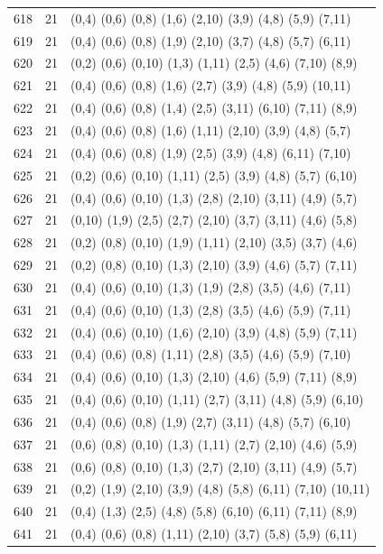 {\begin{longtable}{lll}
618 & 21 & (0,4) (0,6) (0,8) (1,6) (2,10) (3,9) (4,8) (5,9) (7,11) \\
619 & 21 & (0,4) (0,6) (0,8) (1,9) (2,10) (3,7) (4,8) (5,7) (6,11) \\
620 & 21 & (0,2) (0,6) (0,10) (1,3) (1,11) (2,5) (4,6) (7,10) (8,9) \\
621 & 21 & (0,4) (0,6) (0,8) (1,6) (2,7) (3,9) (4,8) (5,9) (10,11) \\
622 & 21 & (0,4) (0,6) (0,8) (1,4) (2,5) (3,11) (6,10) (7,11) (8,9) \\
623 & 21 & (0,4) (0,6) (0,8) (1,6) (1,11) (2,10) (3,9) (4,8) (5,7) \\
624 & 21 & (0,4) (0,6) (0,8) (1,9) (2,5) (3,9) (4,8) (6,11) (7,10) \\
625 & 21 & (0,2) (0,6) (0,10) (1,11) (2,5) (3,9) (4,8) (5,7) (6,10) \\
626 & 21 & (0,4) (0,6) (0,10) (1,3) (2,8) (2,10) (3,11) (4,9) (5,7) \\
627 & 21 & (0,10) (1,9) (2,5) (2,7) (2,10) (3,7) (3,11) (4,6) (5,8) \\
628 & 21 & (0,2) (0,8) (0,10) (1,9) (1,11) (2,10) (3,5) (3,7) (4,6) \\
629 & 21 & (0,2) (0,8) (0,10) (1,3) (2,10) (3,9) (4,6) (5,7) (7,11) \\
630 & 21 & (0,4) (0,6) (0,10) (1,3) (1,9) (2,8) (3,5) (4,6) (7,11) \\
631 & 21 & (0,4) (0,6) (0,10) (1,3) (2,8) (3,5) (4,6) (5,9) (7,11) \\
632 & 21 & (0,4) (0,6) (0,10) (1,6) (2,10) (3,9) (4,8) (5,9) (7,11) \\
633 & 21 & (0,4) (0,6) (0,8) (1,11) (2,8) (3,5) (4,6) (5,9) (7,10) \\
634 & 21 & (0,4) (0,6) (0,10) (1,3) (2,10) (4,6) (5,9) (7,11) (8,9) \\
635 & 21 & (0,4) (0,6) (0,10) (1,11) (2,7) (3,11) (4,8) (5,9) (6,10) \\
636 & 21 & (0,4) (0,6) (0,8) (1,9) (2,7) (3,11) (4,8) (5,7) (6,10) \\
637 & 21 & (0,6) (0,8) (0,10) (1,3) (1,11) (2,7) (2,10) (4,6) (5,9) \\
638 & 21 & (0,6) (0,8) (0,10) (1,3) (2,7) (2,10) (3,11) (4,9) (5,7) \\
639 & 21 & (0,2) (1,9) (2,10) (3,9) (4,8) (5,8) (6,11) (7,10) (10,11) \\
640 & 21 & (0,4) (1,3) (2,5) (4,8) (5,8) (6,10) (6,11) (7,11) (8,9) \\
641 & 21 & (0,4) (0,6) (0,8) (1,11) (2,10) (3,7) (5,8) (5,9) (6,11) \\

\end{longtable}}
